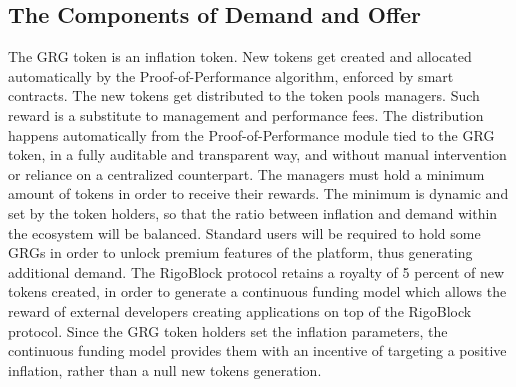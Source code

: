 \documentclass[9pt,oneside]{amsart}
\begin{document}
\begin{multicols}{2}
\subsection{The Components of Demand and Offer}
The GRG token is an inflation token. New tokens get created and allocated automatically by the Proof-of-Performance algorithm, enforced by smart contracts. The new tokens get distributed to the token pools managers. Such reward is a substitute to management and performance fees. The distribution happens automatically from the Proof-of-Performance module tied to the GRG token, in a fully auditable and transparent way, and without manual intervention or reliance on a centralized counterpart. The managers must hold a minimum amount of tokens in order to receive their rewards. The minimum is dynamic and set by the token holders, so that the ratio between inflation and demand within the ecosystem will be balanced. Standard users will be required to hold some GRGs in order to unlock premium features of the platform, thus generating additional demand. The RigoBlock protocol retains a royalty of 5 percent of new tokens created, in order to generate a continuous funding model which allows the reward of external developers creating applications on top of the RigoBlock protocol. Since the GRG token holders set the inflation parameters, the continuous funding model provides them with an incentive of targeting a positive inflation, rather than a null new tokens generation.


\end{multicols}
\end{document}
